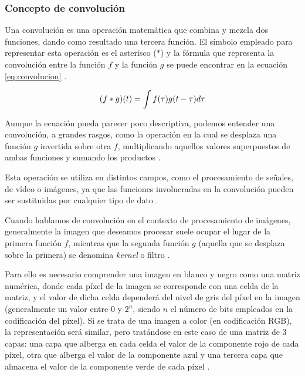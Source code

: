 \subsubsection{Concepto de convolución}

Una convolución es una operación matemática que combina y mezcla dos funciones, dando como resultado una tercera función. El símbolo empleado para representar esta operación es el asterisco ($\ast$) y la fórmula que representa la convolución entre la función $f$ y la función $g$ se puede encontrar en la ecuación \ref{eq:convolucion} \cite{cnn:biblia_deeplearning}.

\begin{equation}
    \centering
    \label{eq:convolucion}
    (f \ast g)(t)=\int f(\tau) g(t-\tau) d \tau
\end{equation}

Aunque la ecuación pueda parecer poco descriptiva, podemos entender una convolución, a grandes rasgos, como la operación en la cual se desplaza una función $g$ invertida sobre otra $f$, multiplicando aquellos valores superpuestos de ambas funciones y sumando los productos \cite{cnn:biblia_deeplearning}.

Esta operación se utiliza en distintos campos, como el procesamiento de señales, de vídeo o imágenes, ya que las funciones involucradas en la convolución pueden ser sustituidas por cualquier tipo de dato \cite{conv:matlab}.

Cuando hablamos de convolución en el contexto de procesamiento de imágenes, generalmente la imagen que deseamos procesar suele ocupar el lugar de la primera función $f$, mientras que la segunda función $g$ (aquella que se desplaza sobre la primera) se denomina \textit{kernel} o filtro \cite{cnn:biblia_deeplearning}.

Para ello es necesario comprender una imagen en blanco y negro como una matriz numérica, donde cada píxel de la imagen se corresponde con una celda de la matriz, y el valor de dicha celda dependerá del nivel de gris del píxel en la imagen (generalmente un valor entre $0$ y $2^n$, siendo $n$ el número de bits empleados en la codificación del píxel). Si se trata de una imagen a color (en codificación RGB), la representación será similar, pero tratándose en este caso de una matriz de 3 capas: una capa que alberga en cada celda el valor de la componente rojo de cada píxel, otra que alberga el valor de la componente azul y una tercera capa que almacena el valor de la componente verde de cada píxel \cite{cnn:images_process}.

